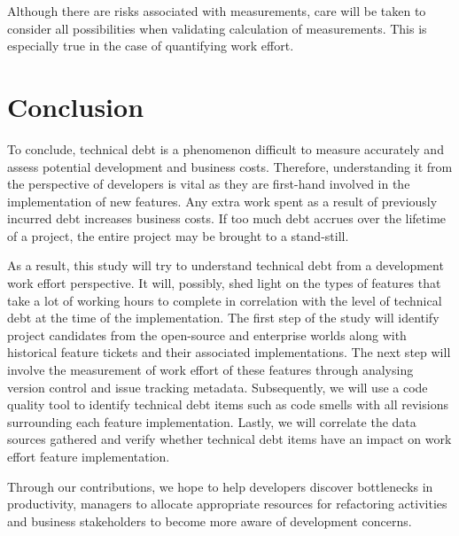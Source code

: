Although there are risks associated with measurements, care will be taken to
consider all possibilities when validating calculation of measurements. This is
especially true in the case of quantifying work effort.

\section{Conclusion}
\label{conclusions}

To conclude, technical debt is a phenomenon difficult to measure accurately and
assess potential development and business costs. Therefore, understanding it
from the perspective of developers is vital as they are first-hand involved in
the implementation of new features. Any extra work spent as a result of
previously incurred debt increases business costs. If too much debt accrues over
the lifetime of a project, the entire project may be brought to a stand-still.

As a result, this study will try to understand technical debt from a development
work effort perspective. It will, possibly, shed light on the types of features
that take a lot of working hours to complete in correlation with the level of
technical debt at the time of the implementation. The first step of the study
will identify project candidates from the open-source and enterprise worlds
along with historical feature tickets and their associated implementations. The
next step will involve the measurement of work effort of these features through
analysing version control and issue tracking metadata. Subsequently, we will use
a code quality tool to identify technical debt items such as code smells with
all revisions surrounding each feature implementation. Lastly, we will correlate
the data sources gathered and verify whether technical debt items have an impact
on work effort feature implementation.

Through our contributions, we hope to help developers discover bottlenecks in
productivity, managers to allocate appropriate resources for refactoring
activities and business stakeholders to become more aware of development
concerns.




